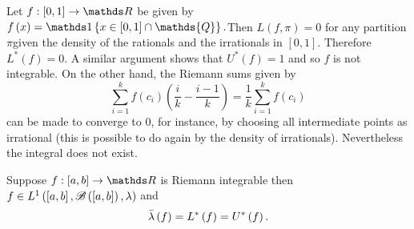 \begin{example}
\label{exa:nonRiemannIntegrableFunction}Let $f:\left[0,1\right]\to\R$
be given by $f\left(x\right)=\indicate\left\{ x\in\left[0,1\right]\cap\mathds{Q}\right\} .$Then
$L\left(f,\pi\right)=0$ for any partition $\pi$given the density
of the rationals and the irrationals in $\left[0,1\right].$ Therefore
$L^{*}\left(f\right)=0.$ A similar argument shows that $U^{*}\left(f\right)=1$
and so $f$ is not integrable. On the other hand, the Riemann sums
given by 
\[
\sum_{i=1}^{k}f\left(c_{i}\right)\left(\frac{i}{k}-\frac{i-1}{k}\right)=\frac{1}{k}\sum_{i=1}^{k}f\left(c_{i}\right)
\]
can be made to converge to 0, for instance, by choosing all intermediate
points as irrational (this is possible to do again by the density
of irrationals). Nevertheless the integral does not exist.
\end{example}

\begin{thm}
\label{thm:lebesgueRiemannEqual}Suppose $f:\left[a,b\right]\to\R$
is Riemann integrable then $f\in L^{1}\left(\left[a,b\right],\mathscr{B}\left(\left[a,b\right]\right),\lambda\right)$
and 
\[
\bar{\lambda}\left(f\right)=L^{*}\left(f\right)=U^{*}\left(f\right).
\]
\end{thm}


